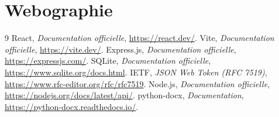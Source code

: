 \documentclass[12pt,a4paper,oneside]{report}
\begin{document}
\chapter*{Webographie}
\begin{thebibliography}{9}
 React, \emph{Documentation officielle}, \url{https://react.dev/}.
 Vite, \emph{Documentation officielle}, \url{https://vite.dev/}.
 Express.js, \emph{Documentation officielle}, \url{https://expressjs.com/}.
 SQLite, \emph{Documentation officielle}, \url{https://www.sqlite.org/docs.html}.
 IETF, \emph{JSON Web Token (RFC 7519)}, \url{https://www.rfc-editor.org/rfc/rfc7519}.
 Node.js, \emph{Documentation officielle}, \url{https://nodejs.org/docs/latest/api/}.
 python-docx, \emph{Documentation}, \url{https://python-docx.readthedocs.io/}.
\end{thebibliography}

\appendix
\end{document}
